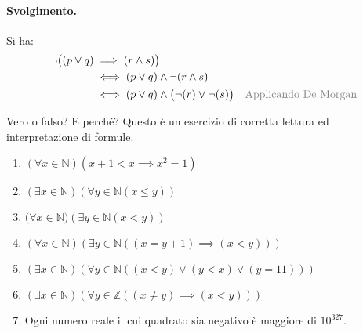 \paragraph*{Svolgimento.} Si ha:
\begin{align*}
	\neg \bigl((p \lor q) &\implies (r \land s) \bigr) \\
	&\iff (p \lor q) \land \neg(r \land s)\\
	&\iff (p \lor q) \land \bigl(\neg(r) \lor \neg(s)\bigr) & \text{\textcolor{gray}{Applicando De Morgan}}
\end{align*}
\begin{flushright}
	\blacksquare
\end{flushright}
\begin{exsbox}
	Vero o falso? E perché? Questo è un esercizio di corretta lettura ed interpretazione di formule.
	\begin{enumerate}
		\item $(\forall x \in \mathbb{N})(x+1 < x \implies x^{2}=1)$
		\item $(\exists x \in \mathbb{N}) (\forall y \in \mathbb{N}(x \leq y))$
		\item $(\forall x \in \mathbb{N)}(\exists y \in \mathbb{N}(x<y))$
		\item $(\forall x \in \mathbb{N})(\exists y \in \mathbb{N}((x=y+1)\implies(x<y)))$
		\item $(\exists x \in \mathbb{N}) (\forall y \in \mathbb{N}((x<y)\lor(y<x)\lor(y=11)))$
		\item $(\exists x \in \mathbb{N})(\forall y \in \mathbb{Z}((x \neq y)\implies (x<y)))$
		\item Ogni numero reale il cui quadrato sia negativo è maggiore di $10^{327}$.
	\end{enumerate}
\end{exsbox}

